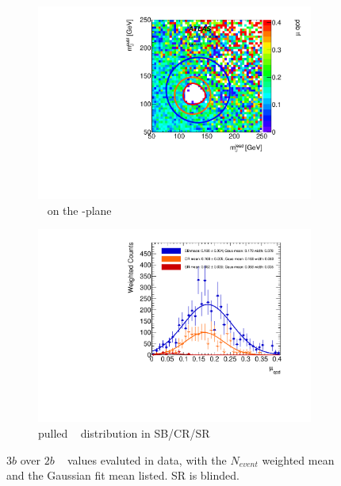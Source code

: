 \begin{figure}[htbp!]
\centering
\captionsetup{justification=centering}
	\hspace{-1cm}
    \begin{subfigure}[b]{0.4\textwidth}
        \includegraphics[width=\textwidth,angle=-90]{figures/boosted/AppendixMuqcdstudy/ThreeTag_Incl_mH0H1.pdf}
        \caption{\muqcd~ on the \mleadJ-\msublJ plane}
        \label{fig:app-muqcd-3b-2d}
    \end{subfigure}
    \quad \quad \quad \quad 
    \begin{subfigure}[b]{0.4\textwidth}
        \includegraphics[width=\textwidth,angle=-90]{figures/boosted/AppendixMuqcdstudy/ThreeTag_Incl_mH0H1_pull.pdf}
        \caption{pulled \muqcd~ distribution in SB/CR/SR}
        \label{fig:app-muqcd-3b-pull}
    \end{subfigure}
\caption{$3b$ over $2b$ \muqcd~ values evaluted in data, with the $N_{event}$ weighted mean and the Gaussian fit mean listed. SR is blinded.}
\label{fig:app-muqcd-3b}
\end{figure}

